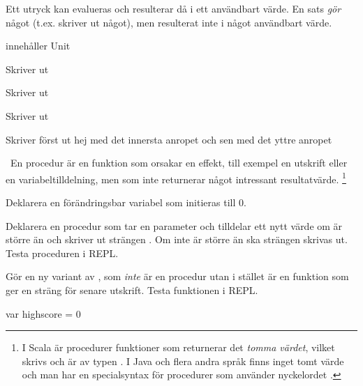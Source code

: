 \TaskSolved \what

\SubtaskSolved  Ett utryck kan evalueras och resulterar då i ett användbart värde. En sats \emph{gör} något (t.ex. skriver ut något), men resulterat inte i något användbart värde.

\SubtaskSolved {}

\SubtaskSolved

  innehåller Unit

 Skriver ut 

 Skriver ut 

 Skriver ut 

 Skriver först ut hej med det innersta anropet och sen \code{()} med det yttre anropet

\SubtaskSolved  {}

\SubtaskSolved  {}

\QUESTEND




\QUESTBEGIN

\Task \what~En procedur är en funktion som orsakar en effekt, till exempel en utskrift eller en variabeltilldelning, men som inte returnerar något intressant resultatvärde.%
\footnote{I Scala är procedurer funktioner som returnerar det \emph{tomma värdet}, vilket skrivs \code{()} och är av typen . I Java och flera andra språk finns inget tomt värde och man har en specialsyntax för procedurer som använder nyckelordet . }

\Subtask Deklarera en förändringsbar variabel  som initieras till 0.

\Subtask Deklarera en procedur  som tar en parameter  och tilldelar  ett nytt värde om  är större än  och skriver ut strängen . Om inte  är större än  ska strängen  skrivas ut. Testa proceduren i REPL.

\Subtask Gör en ny variant av , som \emph{inte} är en procedur utan i stället är en funktion som ger en sträng för senare utskrift. Testa funktionen i REPL.

\SOLUTION

\TaskSolved \what

\SubtaskSolved
\begin{Code}
var highscore = 0
\end{Code}

